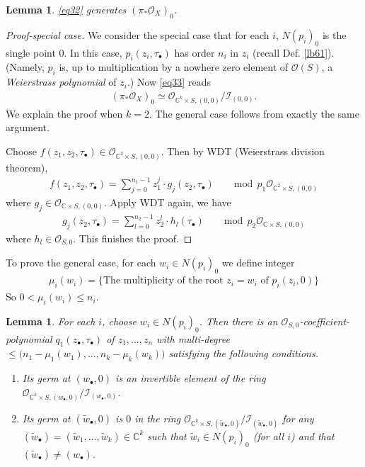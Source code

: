 \documentclass[12pt,b5paper,notitlepage]{report}
\theoremstyle{definition}
\theoremstyle{plain}
\newtheorem{lm}[df]{Lemma}
\newcommand{\mc}{\mathcal}
\newcommand{\wtd}{\widetilde}
\newcommand{\scr}{\mathscr}
\newcommand{\blt}{\bullet}
\newcommand{\Cbb}{\mathbb C}
\numberwithin{equation}{section}
\begin{document}
\begin{lm}\label{lb62}
\eqref{eq32} generates $(\pi_*\scr O_X)_0$.
\end{lm}
\begin{proof}[Proof-special case]
We consider the special case that for each $i$, $N(p_i)_0$ is the single point $0$. In this case, $p_i(z_i,\tau_\blt)$ has order $n_i$ in $z_i$ (recall Def. \ref{lb61}). (Namely, $p_i$ is, up to multiplication by a nowhere zero element of $\scr O(S)$, a \emph{Weierstrass polynomial} of $z_i$.) Now \eqref{eq33} reads
\begin{align*}
(\pi_*\scr O_X)_0\simeq \scr O_{\Cbb^k\times S,(0,0)}/\mc I_{(0,0)}.
\end{align*}
We explain the proof when $k=2$. The general case follows from exactly the same argument.

Choose $f(z_1,z_2,\tau_\blt)\in\scr O_{\Cbb^2\times S,(0,0)}$. Then by WDT (Weierstrass division theorem), 
\begin{align*}
f(z_1,z_2,\tau_\blt)=\sum_{j=0}^{n_1-1}z_1^j\cdot g_j(z_2,\tau_\blt)\qquad \mathrm{mod~~}p_1\scr O_{\Cbb^2\times S,(0,0)}
\end{align*}
where $g_j\in\scr O_{\Cbb\times S,(0,0)}$. Apply WDT again, we have
\begin{align*}
g_j(z_2,\tau_\blt)=\sum_{l=0}^{n_2-1}z_2^l\cdot h_l(\tau_\blt)\qquad \mathrm{mod~~}p_2\scr O_{\Cbb\times S,(0,0)}
\end{align*}
where $h_l\in\scr O_{S,0}$. This finishes the proof.
\end{proof}

To prove the general case, for each $w_i\in N(p_i)_0$ we define integer
\begin{align*}
\mu_i(w_i)=\{\text{The multiplicity of the root }z_i=w_i\text{ of }p_i(z_i,0)\}
\end{align*}
So $0<\mu_i(w_i)\leq n_i$.

\begin{lm}\label{lb63}
For each $i$, choose $w_i\in N(p_i)_0$. Then there is an $\scr O_{S,0}$-coefficient-polynomial $q_1(z_\blt,\tau_\blt)$ of $z_1,\dots,z_n$ with multi-degree $\leq \big(n_1-\mu_1(w_1),\dots,n_k-\mu_k(w_k)\big)$ satisfying the following conditions.
\begin{enumerate}[label=(\arabic*)]
\item Its germ at $(w_\blt,0)$ is an invertible element of the ring $\scr O_{\Cbb^k\times S,(w_\blt,0)}/\mc I_{(w_\blt,0)}$. 
\item Its germ at $(\wtd w_\blt,0)$ is $0$ in the ring $\scr O_{\Cbb^k\times S,(\wtd w_\blt,0)}/\mc I_{(\wtd w_\blt,0)}$ for any $(\wtd w_\blt)=(\wtd w_1,\dots,\wtd w_k)\in\Cbb^k$ such that $\wtd w_i\in N(p_i)_0$ (for all $i$) and that $(\wtd w_\blt)\neq (w_\blt)$.
\end{enumerate}
\end{lm}
\end{document}
